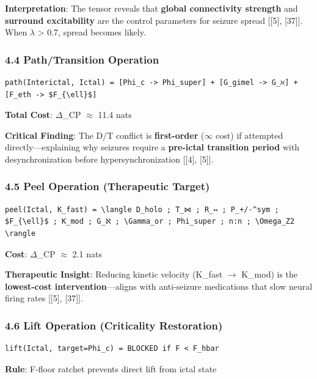 \documentclass[12pt,a4paper]{article}
\begin{document}
\textbf{Interpretation}: The tensor reveals that \textbf{global connectivity strength} and \textbf{surround excitability} are the control parameters for seizure spread {[}{[}5{]}, {[}37{]}{]}. When $\lambda$ \textgreater{} 0.7, spread becomes likely.

\subsubsection{\textbf{4.4 Path/Transition Operation}}

\begin{lstlisting}
path(Interictal, Ictal) = [Phi_c -> Phi_super] + [G_gimel -> G_ℵ] + [F_eth -> $F_{\ell}$]
\end{lstlisting}

\textbf{Total Cost}: $\Delta$\xi\_CP $\approx$ 11.4 nats

\textbf{Critical Finding}: The D/T conflict is \textbf{first-order} ($\infty$ cost) if attempted directly---explaining why seizures require a \textbf{pre-ictal transition period} with desynchronization before hypersynchronization {[}{[}4{]}, {[}5{]}{]}.

\subsubsection{\textbf{4.5 Peel Operation (Therapeutic Target)}}

\begin{lstlisting}
peel(Ictal, K_fast) = \langle D_holo ; T_⋈ ; R_⇔ ; P_+/-^sym ; $F_{\ell}$ ; K_mod ; G_ℵ ; \Gamma_or ; Phi_super ; n:n ; \Omega_Z2 \rangle
\end{lstlisting}

\textbf{Cost}: $\Delta$\xi\_CP $\approx$ 2.1 nats

\textbf{Therapeutic Insight}: Reducing kinetic velocity (K\_fast $\rightarrow$ K\_mod) is the \textbf{lowest-cost intervention}---aligns with anti-seizure medications that slow neural firing rates {[}{[}5{]}, {[}37{]}{]}.

\subsubsection{\textbf{4.6 Lift Operation (Criticality Restoration)}}

\begin{lstlisting}
lift(Ictal, target=Phi_c) = BLOCKED if F < F_hbar
\end{lstlisting}

\textbf{Rule}: F-floor ratchet prevents direct lift from ictal state
\end{document}
